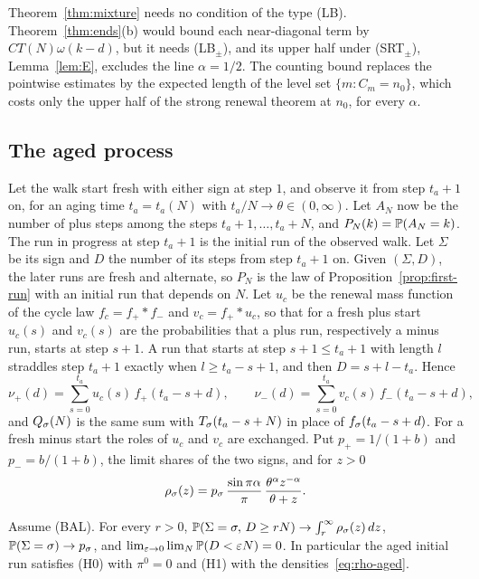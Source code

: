 Theorem~\ref{thm:mixture} needs no condition of the type (LB). Theorem~\ref{thm:ends}(b) would
bound each near-diagonal term by $CT(N)\omega(k-d)$, but it needs (LB$_\pm$), and its upper half
under (SRT$_\pm$), Lemma~\ref{lem:E}, excludes the line $\alpha=1/2$. The counting bound replaces
the pointwise estimates by the expected length of the level set $\{m:C_m=n_0\}$, which costs
only the upper half of the strong renewal theorem at $n_0$, for every $\alpha$.

\subsection{The aged process}\label{sec:aged}

Let the walk start fresh with either sign at step $1$, and observe it from step $t_a+1$
on, for an aging time $t_a=t_a(N)$ with $t_a/N\to\theta\in(0,\infty)$. Let $A_N$ now be the
number of plus steps among the steps $t_a+1,\dots,t_a+N$, and $P_N(k)=\mathbb{P}(A_N=k)$. The run in
progress at step $t_a+1$ is the initial run of the observed walk. Let $\Sigma$ be its sign
and $D$ the number of its steps from step $t_a+1$ on. Given $(\Sigma,D)$, the later runs are
fresh and alternate, so $P_N$ is the law of Proposition~\ref{prop:first-run} with an initial
run that depends on $N$. Let $u_c$ be the renewal mass function of the cycle law
$f_c=f_\plus*f_\minus$ and $v_c=f_\plus*u_c$, so that for a fresh plus start $u_c(s)$ and $v_c(s)$
are the probabilities that a plus run, respectively a minus run, starts at step $s+1$. A run
that starts at step $s+1\le t_a+1$ with length $l$ straddles step $t_a+1$ exactly when
$l\ge t_a-s+1$, and then $D=s+l-t_a$. Hence
\begin{equation}\label{eq:aged-law}
 \nu_\plus(d)=\sum_{s=0}^{t_a}u_c(s)\,f_\plus(t_a-s+d),\qquad
 \nu_\minus(d)=\sum_{s=0}^{t_a}v_c(s)\,f_\minus(t_a-s+d),
\end{equation}
and $Q_\sigma(N)$ is the same sum with $T_\sigma(t_a-s+N)$ in place of $f_\sigma(t_a-s+d)$. For a fresh
minus start the roles of $u_c$ and $v_c$ are exchanged. Put $p_\plus=1/(1+b)$ and
$p_\minus=b/(1+b)$, the limit shares of the two signs, and for $z>0$
\begin{equation}\label{eq:rho-aged}
 \rho_\sigma(z)=p_\sigma\,\frac{\sin\pi\alpha}\pi\,\frac{\theta^\alpha z^{-\alpha}}{\theta+z}.
\end{equation}

\begin{lemma}\label{lem:DL}
Assume (BAL). For every $r>0$, $\mathbb{P}(\Sigma=\sigma,\,D\ge rN)\to\int_r^\infty\rho_\sigma(z)\,dz$,
$\mathbb{P}(\Sigma=\sigma)\to p_\sigma$, and $\lim_{\varepsilon\to0}\lim_N\mathbb{P}(D<\varepsilon N)=0$. In particular
the aged initial run satisfies (H0) with $\pi^0=0$ and (H1) with the densities~\eqref{eq:rho-aged}.
\end{lemma}

